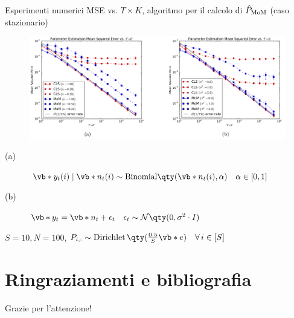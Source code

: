 \documentclass[10pt,xcolor={table,dvipsnames}]{beamer} 		%
\theoremstyle{plain}					%
\theoremstyle{definition}
\theoremstyle{remark}
\begin{document}
    \begin{frame}
        {Esperimenti numerici}
        {MSE vs. \texorpdfstring{$T\times K$}{TxK}, algoritmo per il calcolo di $\hat{P}_{\textup{MoM}}$ {\smaller (caso stazionario)}}
        \begin{figure}[ht]
			\centering
			\includegraphics[width=\textwidth]{Immagini/mom_cls_results_authors.png}
		\end{figure}
        \begin{description}
            \item[(a)] $\vb*{y}_t(i)\mid\vb*{n}_t(i)\sim\mathrm{Binomial}\qty(\vb*{n}_t(i),\alpha)\quad\alpha\in[0,1]$
            \item[(b)] $\vb*{y}_t=\vb*{n}_t+\epsilon_t\quad\epsilon_t\sim\mathcal{N}\qty(0,\sigma^2\cdot I)$
        \end{description}

        $S=10, N=100$, $P_{i,:}\sim\operatorname{Dirichlet}\qty(\frac{0.5}{S}\vb*{e})\quad\forall\,i\in[S]$
    \end{frame}








	

    
\section{Ringraziamenti e bibliografia}
    \begin{frame}
        \begin{center}
            \Huge{Grazie per l'attenzione!}
        \end{center}
    \end{frame}
\end{document}
